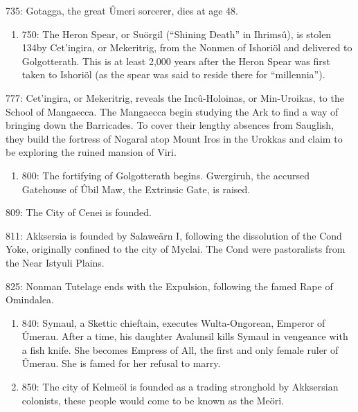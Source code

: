 \documentclass[]{book}
\providecommand{\tightlist}{%
  \setlength{\itemsep}{0pt}\setlength{\parskip}{0pt}}
\begin{document}
735: Gotagga, the great Ûmeri sorcerer, dies at age 48.

\begin{enumerate}
\def\labelenumi{\alph{enumi}.}
\setcounter{enumi}{2}
\tightlist
\item
  750: The Heron Spear, or Suörgil (``Shining Death'' in Ihrimsû), is stolen
  134by Cet'ingira, or Mekeritrig, from the Nonmen of Ishoriöl and delivered to
  Golgotterath. This is at least 2,000 years after the Heron Spear was first taken to
  Ishoriöl (as the spear was said to reside there for ``millennia'').
\end{enumerate}

777: Cet'ingira, or Mekeritrig, reveals the Incû-Holoinas, or Min-Uroikas, to the
School of Mangaecca. The Mangaecca begin studying the Ark to find a way of
bringing down the Barricades. To cover their lengthy absences from Sauglish,
they build the fortress of Nogaral atop Mount Iros in the Urokkas and claim to
be exploring the ruined mansion of Viri.

\begin{enumerate}
\def\labelenumi{\alph{enumi}.}
\setcounter{enumi}{2}
\tightlist
\item
  800: The fortifying of Golgotterath begins. Gwergiruh, the accursed Gatehouse of
  Ûbil Maw, the Extrinsic Gate, is raised.
\end{enumerate}

809: The City of Cenei is founded.

811: Akksersia is founded by Salaweärn I, following the dissolution of the Cond Yoke, originally confined to the city of Myclai. The Cond were pastoralists from the Near Istyuli Plains.

825: Nonman Tutelage ends with the Expulsion, following the famed Rape of Omindalea.

\begin{enumerate}
\def\labelenumi{\alph{enumi}.}
\setcounter{enumi}{2}
\item
  840: Symaul, a Skettic chieftain, executes Wulta-Ongorean, Emperor of Ûmerau.
  After a time, his daughter Avalunsil kills Symaul in vengeance with a fish knife.
  She becomes Empress of All, the first and only female ruler of Ûmerau. She is
  famed for her refusal to marry.
\item
  850: The city of Kelmeöl is founded as a trading stronghold by Akksersian
  colonists, these people would come to be known as the Meöri.
\end{enumerate}
\end{document}
